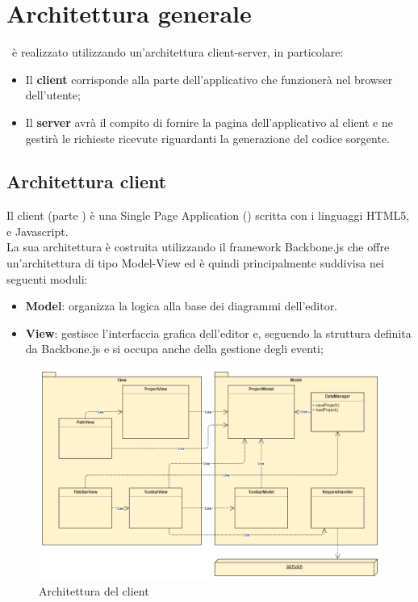 \documentclass[../PianoDiQualifica.tex]{subfiles}
\begin{document}
	\section{Architettura generale}
		\progetto\ è realizzato utilizzando un'architettura client-server, in particolare:
		\begin{itemize}
			\item Il \textbf{client} corrisponde alla parte dell'applicativo che funzionerà nel
			browser dell'utente;
			\item Il \textbf{server} avrà il compito di fornire la pagina dell'applicativo al client
			e ne gestirà le richieste ricevute riguardanti la generazione del codice sorgente.
		\end{itemize}
		\subsection{Architettura client}
			Il client (parte ) è una Single Page Application () scritta con i linguaggi
			HTML5,  e Javascript.\\
			La sua architettura è costruita utilizzando il framework Backbone.js che offre
			un'architettura di tipo Model-View ed è quindi principalmente suddivisa nei seguenti moduli:
			\begin{itemize}
				\item \textbf{Model}: organizza la logica alla base dei diagrammi dell'editor.
				\item \textbf{View}: gestisce l'interfaccia grafica dell'editor e, seguendo la struttura
				definita da Backbone.js e si occupa anche della gestione
				degli eventi; 
			\end{itemize}
			\begin{figure}[H]\label{fig:ClientSubsystem}
				\centering
				\includegraphics[scale=0.46]{Immagini/DiagrammaArchitettura/ClientSubsystem.png}
				\caption{Architettura del client}
			\end{figure}
\end{document}
